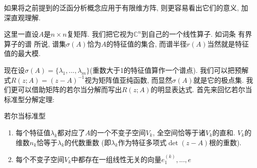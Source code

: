 

如果将之前提到的泛函分析概念应用于有限维方阵, 则更容易看出它们的意义, 加深直观理解. 

这里一直设$A$是$n\times n$复矩阵. 我们把它视为$\mathbb{C}^n$到自己的一个线性算子. 如词条 有界算子的谱 所说, 谱集$\sigma(A)$恰为$A$的特征值的集合, 而谱半径$r(A)$当然就是特征值的最大模. 

现在设$\sigma(A)=\{\lambda_1,...,\lambda_m\}$(重数大于1的特征值算作一个谱点). 我们可以把预解式$R(z;A)=(z-A)^{-1}$视为矩阵值亚纯函数, 而显然$\sigma(A)$就是它的极点集. 我们更可以借助矩阵的若尔当分解而写出$R(z;A)$的明显表达式. 首先来回忆若尔当标准型分解定理:

\begin{theorem}{若尔当标准型}
\begin{enumerate}
\item 每个特征值$\lambda_k$都对应了$A$的一个不变子空间$V_k$, 全空间恰等于诸$V_k$的直和. $V_k$的维数$n_k$恰等于$\lambda_k$的代数重数 (即$\lambda_k$作为特征多项式$\det(z-A)$根的重数).
\item 每个不变子空间$V_k$中都存在一组线性无关的向量$e^{(k)}_1,...,e$
\end{enumerate}
\end{theorem}